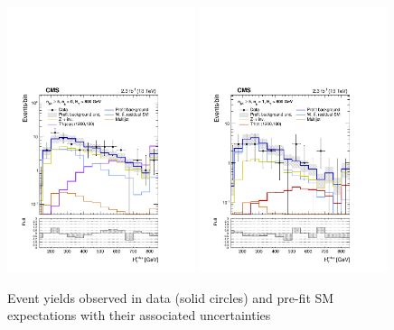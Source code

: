\begin{figure}[!t]
  \begin{center}
    \includegraphics[width=0.49\textwidth]{figures/mht_shapes/v3/postFitShape_eq0b_ge5j_800_Inf_prefit} 
    \includegraphics[width=0.49\textwidth]{figures/mht_shapes/v3/postFitShape_eq1b_ge5j_800_Inf_prefit} \\
  \end{center}
  \caption{Event yields observed in data (solid circles) and
    pre-fit SM expectations with their associated uncertainties
}
\end{figure}
